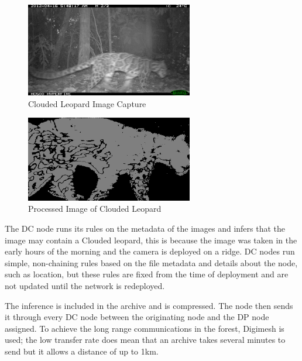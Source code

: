 			\begin{figure}[!t]
			\centering
			\includegraphics[width=0.65\textwidth]{Chap4/figures/leopard2.JPG}
			\caption{Clouded Leopard Image Capture}
			\label{cl2}
			\end{figure}

			\begin{figure}[!t]
			\centering
			\includegraphics[width=0.65\textwidth]{Chap4/figures/leopard_proc}
			\caption{Processed Image of Clouded Leopard}
			\label{clproc}
			\end{figure}
			
			The DC node runs its rules on the metadata of the images and infers that the image may contain a Clouded leopard, this is because the image was taken in the early hours of the morning and the camera is deployed on a ridge. DC nodes run simple, non-chaining rules based on the file metadata and details about the node, such as location, but these rules are fixed from the time of deployment and are not updated until the network is redeployed.
			
			The inference is included in the archive and is compressed. The node then sends it through every DC node between the originating node and the DP node assigned. To achieve the long range communications in the forest, Digimesh is used; the low transfer rate does mean that an archive takes several minutes to send but it allows a distance of up to 1km.

